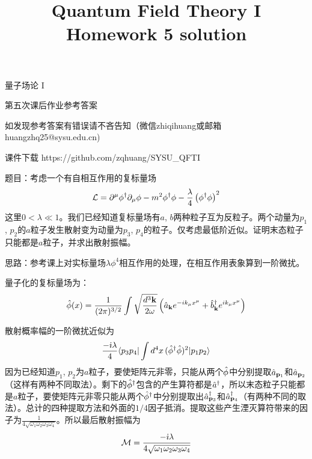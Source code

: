 \documentclass[CJK]{beamer}
\title{Quantum Field Theory I \\ Homework 5 solution}
\author{}
\date{}
\begin{document}
\begin{frame}
 
\begin{center}
\begin{Large}
\bch
量子场论 I 

{\vskip 0.3in}

第五次课后作业参考答案
\skipline
\skipline

如发现参考答案有错误请不吝告知（微信zhiqihuang或邮箱huangzhq25@sysu.edu.cn)
\ech
\end{Large}
\end{center}

\vskip 0.2in

\bch
课件下载
\ech
https://github.com/zqhuang/SYSU\_QFTI

\end{frame}


\begin{frame}
\bch
{\small
题目：考虑一个有自相互作用的复标量场
$$ {\mathcal{L}} = \partial^\mu\phi^\dagger \partial_\mu \phi - m^2\phi^\dagger\phi - \frac{\lambda}{4}\left(\phi^\dagger\phi\right)^2$$
这里$0<\lambda\ll 1$。我们已经知道复标量场有$a$, $b$两种粒子互为反粒子。两个动量为$p_1$, $p_2$的$a$粒子发生散射变为动量为$p_3$, $p_4$的粒子。仅考虑最低阶近似。证明末态粒子只能都是$a$粒子，并求出散射振幅。}

\skipline

思路：参考课上对实标量场$\lambda\phi^4$相互作用的处理，在相互作用表象算到一阶微扰。
\ech
\end{frame}

\begin{frame}
\bch
{\small
量子化的复标量场为：
$${\hat{\phi}}(x) = \frac{1}{(2\pi)^{3/2}} \int \sqrt{\frac{d^3{\mathbf{k}}}{2\omega}} \left({\hat{a}}_{{\mathbf{k}}} e^{-ik_\mu x^\mu} + {\hat{b}^\dagger}_{{\mathbf{k}}}e^{ik_\mu x^\mu}\right) $$

散射概率幅的一阶微扰近似为
$$ \frac{-{\dot{\imath}} \lambda}{4}\langle p_3 p_4|\int d^4x\, ({\hat{\phi}}^\dagger{\hat{\phi}})^2|p_1 p_2\rangle $$
因为已经知道$p_1$, $p_2$为$a$粒子，要使矩阵元非零，只能从两个${\hat{\phi}}$中分别提取${\hat{a}}_{{\mathbf{p}}_1}$和${\hat{a}}_{{\mathbf{p}}_2}$（这样有两种不同取法）。剩下的${\hat{\phi}}^\dagger$包含的产生算符都是${\hat{a}^\dagger}$，所以末态粒子只能都是$a$粒子，要使矩阵元非零只能从两个${\hat{\phi}}^\dagger$中分别提取出${\hat{a}^\dagger}_{{\mathbf{p}}_3}$和${\hat{a}^\dagger}_{{\mathbf{p}}_4}$（有两种不同的取法）。总计的四种提取方法和外面的$1/4$因子抵消。提取这些产生湮灭算符带来的因子为$\frac{1}{4\sqrt{\omega_1\omega_2\omega_3\omega_4}}$。所以最后散射振幅为
$${\mathcal{M}} = \frac{- {\dot{\imath}}\lambda}{ 4\sqrt{\omega_1\omega_2\omega_3\omega_4}}$$
}

\ech
\end{frame}
\end{document}
